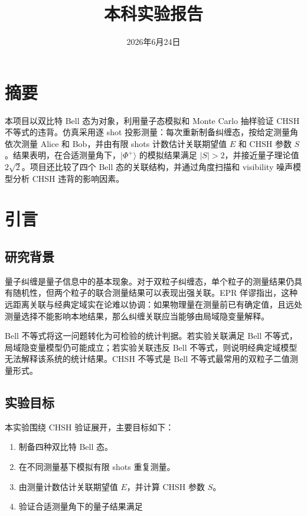 \documentclass{zjureport}
\title{本科实验报告}
\date{2026年6月24日}
\begin{document}
\makecover
\makecontent

\section*{摘要}

本项目以双比特 Bell 态为对象，利用量子态模拟和 Monte Carlo 抽样验证 CHSH 不等式的违背。仿真采用逐 shot 投影测量：每次重新制备纠缠态，按给定测量角依次测量 Alice 和 Bob，并由有限 shots 计数估计关联期望值 \(E\) 和 CHSH 参数 \(S\)。结果表明，在合适测量角下，\(|\Phi^+\rangle\) 的模拟结果满足 \(|S|>2\)，并接近量子理论值 \(2\sqrt{2}\)。项目还比较了四个 Bell 态的关联结构，并通过角度扫描和 visibility 噪声模型分析 CHSH 违背的影响因素。

\section{引言}\label{ux5f15ux8a00}

\subsection{研究背景}\label{ux7814ux7a76ux80ccux666f}

量子纠缠是量子信息中的基本现象。对于双粒子纠缠态，单个粒子的测量结果仍具有随机性，但两个粒子的联合测量结果可以表现出强关联。EPR 佯谬指出，这种远距离关联与经典定域实在论难以协调：如果物理量在测量前已有确定值，且远处测量选择不能影响本地结果，那么纠缠关联应当能够由局域隐变量解释。

Bell 不等式将这一问题转化为可检验的统计判据。若实验关联满足 Bell 不等式，局域隐变量模型仍可能成立；若实验关联违反 Bell 不等式，则说明经典定域模型无法解释该系统的统计结果。CHSH 不等式是 Bell 不等式最常用的双粒子二值测量形式。

\subsection{实验目标}\label{ux5b9eux9a8cux76eeux6807}

本实验围绕 CHSH 验证展开，主要目标如下：

\begin{enumerate}
\def\labelenumi{\arabic{enumi}.}
\item
  制备四种双比特 Bell 态。
\item
  在不同测量基下模拟有限 shots 重复测量。
\item
  由测量计数估计关联期望值 \(E\)，并计算 CHSH 参数 \(S\)。
\item
  验证合适测量角下的量子结果满足
\end{enumerate}
\end{document}

